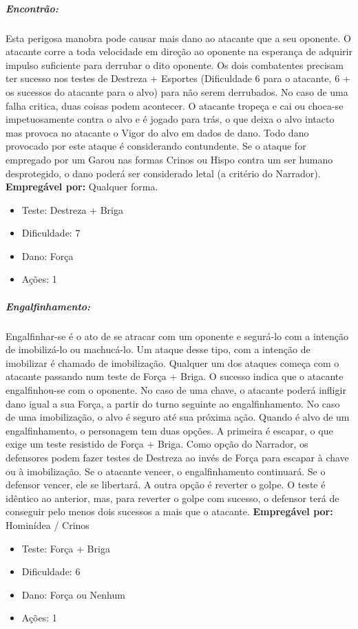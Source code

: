 \subparagraph{\bf Encontrão:}\label{encontrao}
Esta perigosa manobra pode causar mais dano ao atacante que a seu oponente. O atacante corre a toda velocidade em direção ao oponente na esperança de adquirir impulso suficiente para derrubar o dito oponente. Os dois combatentes precisam ter sucesso nos testes de Destreza + Esportes (Dificuldade 6 para o atacante, 6 + os sucessos do atacante para o alvo) para não serem derrubados.
No caso de uma falha critica, duas coisas podem acontecer. O atacante tropeça e cai ou choca-se impetuosamente contra o alvo e é jogado para trás, o que deixa o alvo intacto mas provoca no atacante o Vigor do alvo em dados de dano.
Todo dano provocado por este ataque é considerando contundente. Se o ataque for empregado por um Garou nas formas Crinos ou Hispo contra um ser humano desprotegido, o dano poderá ser considerado letal (a critério do Narrador).
{\bf Empregável por:} Qualquer forma.
\begin{itemize}[noitemsep]
\item Teste: Destreza + Briga
\item Dificuldade: 7
\item Dano: Força
\item Ações: 1
\end{itemize}

\subparagraph{\bf Engalfinhamento:}
Engalfinhar-se é o ato de se atracar com um oponente e segurá-lo com a intenção de imobilizá-lo ou machucá-lo. Um ataque desse tipo, com a intenção de imobilizar é chamado de imobilização.
Qualquer um dos ataques começa com o atacante passando num teste de Força + Briga. O sucesso indica que o atacante engalfinhou-se com o oponente. No caso de uma chave, o atacante poderá infligir dano igual a sua Força, a partir do turno seguinte ao engalfinhamento. No caso de uma imobilização, o alvo é seguro até sua próxima ação.
Quando é alvo de um engalfinhamento, o personagem tem duas opções. A primeira é escapar, o que exige um teste resistido de Força + Briga. Como opção do Narrador, os defensores podem fazer testes de Destreza ao invés de Força para escapar à chave ou à imobilização. Se o atacante vencer, o engalfinhamento continuará. Se o defensor vencer, ele se libertará. A outra opção é reverter o golpe. O teste é idêntico ao anterior, mas, para reverter o golpe com sucesso, o defensor terá de conseguir pelo menos dois sucessos a mais que o atacante.
{\bf Empregável por:} Hominídea / Crinos
\begin{itemize}[noitemsep]
\item Teste: Força + Briga
\item Dificuldade: 6
\item Dano: Força ou Nenhum
\item Ações: 1
\end{itemize}

